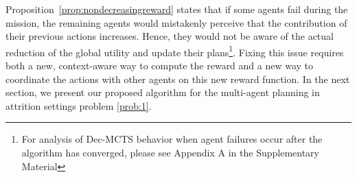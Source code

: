Proposition~\ref{prop:nondecreasingreward} states that if some agents fail during the mission, the remaining agents would mistakenly perceive that the contribution of their previous actions increases. Hence, they would not be aware of the actual reduction of the global utility and update their plans\footnote{For analysis of Dec-MCTS behavior when agent failures occur after the algorithm has converged, please see Appendix A in the Supplementary Material}. Fixing this issue requires both a new, context-aware way to compute the reward and a new way to coordinate the actions with other agents on this new reward function. In the next section, we present our proposed algorithm for the multi-agent planning in attrition settings problem \ref{prob:1}.
